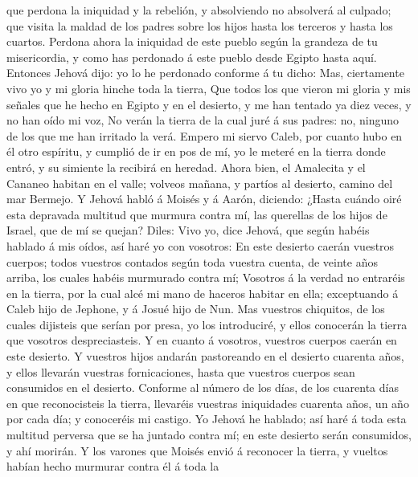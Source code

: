 que perdona la iniquidad y la rebelión, y absolviendo no absolverá al
culpado; que visita la maldad de los padres sobre los hijos hasta los
terceros y hasta los cuartos.  Perdona ahora la iniquidad
de este pueblo según la grandeza de tu misericordia, y como has
perdonado á este pueblo desde Egipto hasta aquí. 
Entonces Jehová dijo: yo lo he perdonado conforme á tu dicho:
 Mas, ciertamente vivo yo y mi gloria hinche toda la
tierra,  Que todos los que vieron mi gloria y mis señales
que he hecho en Egipto y en el desierto, y me han tentado ya diez veces,
y no han oído mi voz,  No verán la tierra de la cual juré
á sus padres: no, ninguno de los que me han irritado la verá.
 Empero mi siervo Caleb, por cuanto hubo en él otro
espíritu, y cumplió de ir en pos de mí, yo le meteré en la tierra donde
entró, y su simiente la recibirá en heredad.  Ahora bien,
el Amalecita y el Cananeo habitan en el valle; volveos mañana, y partíos
al desierto, camino del mar Bermejo.  Y Jehová habló á
Moisés y á Aarón, diciendo:  ¿Hasta cuándo oiré esta
depravada multitud que murmura contra mí, las querellas de los hijos de
Israel, que de mí se quejan?  Diles: Vivo yo, dice
Jehová, que según habéis hablado á mis oídos, así haré yo con vosotros:
 En este desierto caerán vuestros cuerpos; todos vuestros
contados según toda vuestra cuenta, de veinte años arriba, los cuales
habéis murmurado contra mí;  Vosotros á la verdad no
entraréis en la tierra, por la cual alcé mi mano de haceros habitar en
ella; exceptuando á Caleb hijo de Jephone, y á Josué hijo de Nun.
 Mas vuestros chiquitos, de los cuales dijisteis que
serían por presa, yo los introduciré, y ellos conocerán la tierra que
vosotros despreciasteis.  Y en cuanto á vosotros,
vuestros cuerpos caerán en este desierto.  Y vuestros
hijos andarán pastoreando en el desierto cuarenta años, y ellos llevarán
vuestras fornicaciones, hasta que vuestros cuerpos sean consumidos en el
desierto.  Conforme al número de los días, de los
cuarenta días en que reconocisteis la tierra, llevaréis vuestras
iniquidades cuarenta años, un año por cada día; y conoceréis mi castigo.
 Yo Jehová he hablado; así haré á toda esta multitud
perversa que se ha juntado contra mí; en este desierto serán consumidos,
y ahí morirán.  Y los varones que Moisés envió á
reconocer la tierra, y vueltos habían hecho murmurar contra él á toda la
